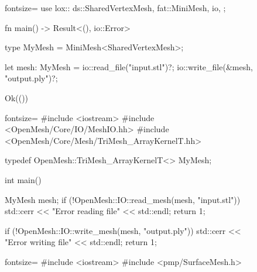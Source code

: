 \begin{figure}[p]
  \begin{minipage}{.04\textwidth}
  \end{minipage}
  \begin{minipage}{.9\textwidth}
    \begin{rustcode*}{fontsize=\footnotesize}
      use lox::{
          ds::SharedVertexMesh,
          fat::MiniMesh,
          io,
      };

      fn main() -> Result<(), io::Error> {
          type MyMesh = MiniMesh<SharedVertexMesh>;

          let mesh: MyMesh = io::read_file("input.stl")?;
          io::write_file(&mesh, "output.ply")?;

          Ok(())
      }
    \end{rustcode*}
  \end{minipage}\vspace{2mm}

  \begin{minipage}{.04\textwidth}
  \end{minipage}
  \begin{minipage}{.9\textwidth}
    \begin{cppcode*}{fontsize=\footnotesize}
      #include <iostream>
      #include <OpenMesh/Core/IO/MeshIO.hh>
      #include <OpenMesh/Core/Mesh/TriMesh_ArrayKernelT.hh>

      typedef OpenMesh::TriMesh_ArrayKernelT<> MyMesh;

      int main() {
          MyMesh mesh;
          if (!OpenMesh::IO::read_mesh(mesh, "input.stl")) {
              std::cerr << "Error reading file" << std::endl;
              return 1;
          }

          if (!OpenMesh::IO::write_mesh(mesh, "output.ply")) {
              std::cerr << "Error writing file" << std::endl;
              return 1;
          }
      }
    \end{cppcode*}
  \end{minipage}\vspace{2mm}

  \begin{minipage}{.04\textwidth}
  \end{minipage}
  \begin{minipage}{.9\textwidth}
    \begin{cppcode*}{fontsize=\footnotesize}
      #include <iostream>
      #include <pmp/SurfaceMesh.h>


\end{cppcode*}
\end{minipage}
\end{figure}
